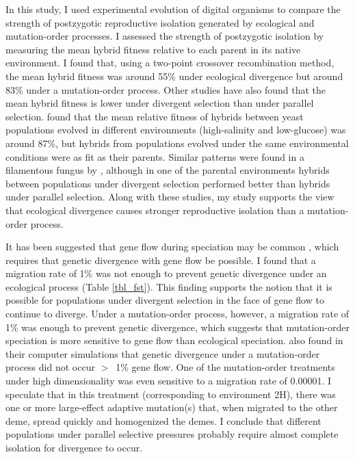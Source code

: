 \begin{doublespace}
In this study, I used experimental evolution of digital organisms
to compare the strength of postzygotic reproductive isolation
generated by ecological and mutation-order processes.
%
I assessed the strength of postzygotic isolation
by measuring the mean hybrid fitness relative to each parent
in its native environment.
%
I found that, using a two-point crossover recombination method,
the mean hybrid fitness was around 55\% under ecological divergence
but around 83\% under a mutation-order process.
%
Other studies have also found that the mean hybrid fitness
is lower under divergent selection than under parallel selection.
%
\citet{det07} found that the mean relative fitness of hybrids
between yeast populations evolved in different environments
(high-salinity and low-glucose) was around 87\%,
but hybrids from populations evolved
under the same environmental conditions were as fit as their parents.
%
Similar patterns were found in a filamentous fungus by \citet{det08},
although in one of the parental environments
hybrids between populations under divergent selection
performed better than hybrids under parallel selection.
%
Along with these studies, my study supports
the view that ecological divergence causes
stronger reproductive isolation than a mutation-order process.



It has been suggested that gene flow during speciation
may be common \citetext{\citealt{coy04}, p. 112; \citealt{nos08}},
which requires that genetic divergence with gene flow be possible.
%
I found that a migration rate of 1\% was not enough to prevent
genetic divergence under an ecological process (Table \ref{tbl_fst}).
%
This finding supports the notion that it is possible for populations
under divergent selection in the face of gene flow to continue to diverge.
%
Under a mutation-order process, however, a migration rate of 1\%
was enough to prevent genetic divergence,
which suggests that mutation-order speciation
is more sensitive to gene flow than ecological speciation.
%
\cite{nos11} also found in their computer simulations
that genetic divergence under a mutation-order process
did not occur $>$~1\% gene flow.
%
One of the mutation-order treatments under high dimensionality
was even sensitive to a migration rate of 0.00001.
%
I speculate that in this treatment (corresponding to environment 2H),
there was one or more large-effect adaptive mutation(s) that,
when migrated to the other deme, spread quickly and homogenized the demes.
%
I conclude that different populations under parallel selective pressures
probably require almost complete isolation for divergence to occur.




\end{doublespace}
